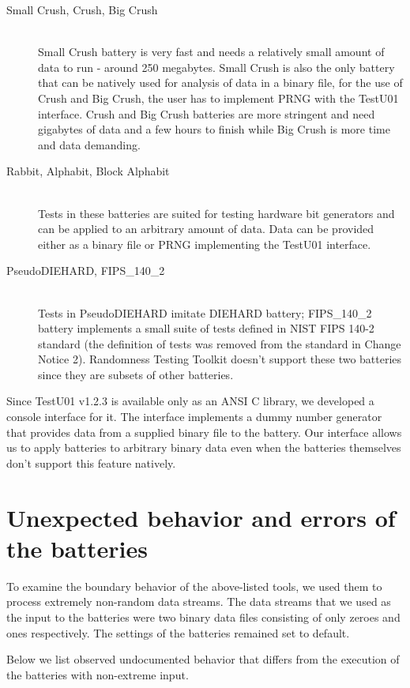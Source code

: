 \documentclass[
  digital,  	%
  color,		%
  oneside,   	%
  12pt,
  nocover,
  notable,
  nolof,
  nolot,
]{fithesis3}
\theoremstyle{definition}
\theoremstyle{remark}
\begin{document}
\begin{description}
\item[Small Crush, Crush, Big Crush] \hfill \\
Small Crush battery is very fast and needs a relatively small amount of data to run - around 250 megabytes. Small Crush is also the only battery that can be natively used for analysis of data in a binary file, for the use of Crush and Big Crush, the user has to implement PRNG with the TestU01 interface. Crush and Big Crush batteries are more stringent and need gigabytes of data and a few hours to finish while Big Crush is more time and data demanding.
\item[Rabbit, Alphabit, Block Alphabit] \hfill \\
Tests in these batteries are suited for testing hardware bit generators and can be applied to an arbitrary amount of data. Data can be provided either as a binary file or PRNG implementing the TestU01 interface.
\item[PseudoDIEHARD, FIPS\_140\_2] \hfill \\
Tests in PseudoDIEHARD imitate DIEHARD battery; FIPS\_140\_2 battery implements a small suite of tests defined in NIST FIPS 140-2 standard \cite{nist-fips-140-2} (the definition of tests was removed from the standard in Change Notice 2). Randomness Testing Toolkit doesn't support these two batteries since they are subsets of other batteries.
\end{description}

Since TestU01 v1.2.3 is available only as an ANSI C library, we developed a console interface for it. The interface implements a dummy number generator that provides data from a supplied binary file to the battery. Our interface allows us to apply batteries to arbitrary binary data even when the batteries themselves don't support this feature natively.

\section{Unexpected behavior and errors of the batteries}
To examine the boundary behavior of the above-listed tools, we used them to process extremely non-random data streams. The data streams that we used as the input to the batteries were two binary data files consisting of only zeroes and ones respectively. The settings of the batteries remained set to default. 

Below we list observed undocumented behavior that differs from the execution of the batteries with non-extreme input.
\end{document}
